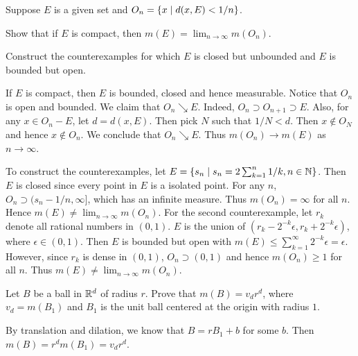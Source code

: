 \begin{exercise}
    Suppose $E$ is a given set and $O_n = \left\{ x \;\middle\vert\; d(x,E)<1/n \right\}$.
    \begin{thmenum}
        \item Show that if $E$ is compact, then $m(E)
        =\lim_{n\to\infty}m(O_n)$.
        \item Construct the counterexamples for which 
        $E$ is closed but unbounded and $E$ is bounded but open.
    \end{thmenum}
\end{exercise}
\begin{pf}
    If $E$ is compact, then $E$ is bounded, closed and hence 
    measurable. Notice that $O_n$ is open and bounded. We 
    claim that $O_n\searrow E$. Indeed, $O_n\supset O_{n+1}
    \supset E$. Also, for any $x\in O_n-E$, let $d = d(x,E)$.
    Then pick $N$ such that $1/N<d$. Then $x\not\in O_N$ and 
    hence $x\not\in O_n$. We conclude that $O_n\searrow E$.
    Thus $m(O_n)\to m(E)$ as $n\to \infty$.

    To construct the counterexamples, let 
    $E = \left\{ s_n \;\middle\vert\; s_n=2\sum_{k=1}^{n}1/k,n\in\mathbb{N} \right\}$. Then $E$ 
    is closed since every point in $E$ is a isolated point. 
    For any $n$, $O_n \supset (s_n-1/n,\infty]$, which has 
    an infinite measure. Thus $m(O_n)=\infty$ for all $n$.
    Hence $m(E)\neq\lim_{n\to\infty}m(O_n)$. For the second
    counterexample, let $r_k$ denote all rational numbers in 
    $(0,1)$. $E$ is the union of 
    $(r_k-2^{-k}\epsilon,r_k+2^{-k}\epsilon)$, where 
    $\epsilon\in(0,1)$. Then $E$ is bounded but open with 
    $m(E)\leq\sum_{k=1}^{\infty}2^{-k}\epsilon = \epsilon$. 
    However, since $r_k$ is dense in $(0,1)$, $O_n\supset
    (0,1)$ and hence $m(O_n)\geq 1$ for all $n$. Thus $m(E)
    \neq\lim_{n\to\infty}m(O_n)$.
\end{pf}

\begin{exercise}
    Let $B$ be a ball in $\mathbb{R}^d$ of radius $r$. Prove that 
    $m(B) = v_d r^d$, where $v_d = m(B_1)$ and $B_1$ is the 
    unit ball centered at the origin with radius $1$.
\end{exercise}
\begin{pf}
    By translation and dilation, we know that $B = rB_1+b$ 
    for some $b$. Then $m(B) = r^dm(B_1) = v_d r^d$. 
\end{pf}

